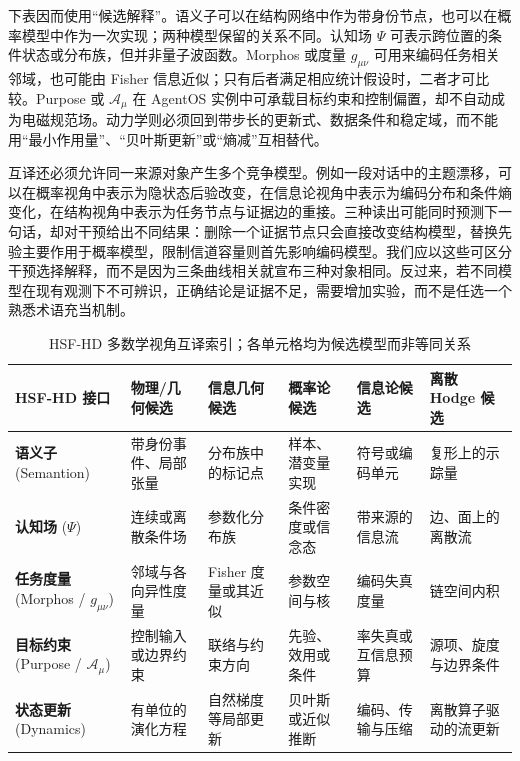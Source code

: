 下表因而使用“候选解释”。语义子可以在结构网络中作为带身份节点，也可以在概率模型中作为一次实现；两种模型保留的关系不同。认知场 $\Psi$ 可表示跨位置的条件状态或分布族，但并非量子波函数。Morphos 或度量 $g_{\mu\nu}$ 可用来编码任务相关邻域，也可能由 Fisher 信息近似；只有后者满足相应统计假设时，二者才可比较。Purpose 或 $\mathcal A_\mu$ 在 AgentOS 实例中可承载目标约束和控制偏置，却不自动成为电磁规范场。动力学则必须回到带步长的更新式、数据条件和稳定域，而不能用“最小作用量”、“贝叶斯更新”或“熵减”互相替代。

互译还必须允许同一来源对象产生多个竞争模型。例如一段对话中的主题漂移，可以在概率视角中表示为隐状态后验改变，在信息论视角中表示为编码分布和条件熵变化，在结构视角中表示为任务节点与证据边的重接。三种读出可能同时预测下一句话，却对干预给出不同结果：删除一个证据节点只会直接改变结构模型，替换先验主要作用于概率模型，限制信道容量则首先影响编码模型。我们应以这些可区分干预选择解释，而不是因为三条曲线相关就宣布三种对象相同。反过来，若不同模型在现有观测下不可辨识，正确结论是证据不足，需要增加实验，而不是任选一个熟悉术语充当机制。

\begin{table}[htbp]
\centering
\footnotesize
\renewcommand{\arraystretch}{1.45}
\begin{tabularx}{\textwidth}{l|X|X|X|X|X}
\toprule
\rowcolor{structurecolor!20} \textbf{HSF-HD 接口} & \textbf{物理/几何候选} & \textbf{信息几何候选} & \textbf{概率论候选} & \textbf{信息论候选} & \textbf{离散 Hodge 候选} \\
\midrule
\textbf{语义子} \newline (Semantion) & 带身份事件、局部张量 & 分布族中的标记点 & 样本、潜变量实现 & 符号或编码单元 & 复形上的示踪量 \\
\hline
\textbf{认知场} \newline ($\Psi$) & 连续或离散条件场 & 参数化分布族 & 条件密度或信念态 & 带来源的信息流 & 边、面上的离散流 \\
\hline
\textbf{任务度量} \newline (Morphos / $g_{\mu\nu}$) & 邻域与各向异性度量 & Fisher 度量或其近似 & 参数空间与核 & 编码失真度量 & 链空间内积 \\
\hline
\textbf{目标约束} \newline (Purpose / $\mathcal A_\mu$) & 控制输入或边界约束 & 联络与约束方向 & 先验、效用或条件 & 率失真或互信息预算 & 源项、旋度与边界条件 \\
\hline
\textbf{状态更新} \newline (Dynamics) & 有单位的演化方程 & 自然梯度等局部更新 & 贝叶斯或近似推断 & 编码、传输与压缩 & 离散算子驱动的流更新 \\
\bottomrule
\end{tabularx}
\caption{HSF-HD 多数学视角互译索引；各单元格均为候选模型而非等同关系}
\label{tab:hsf_rosetta_stone}
\end{table}

